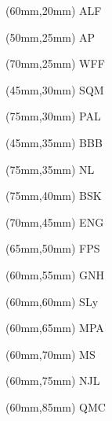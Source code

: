 \documentclass[11pt]{beamer}
\begin{document}
\begin{frame}{}

\begin{textblock*}{0.5pt}(60mm,20mm)
    ALF
    \end{textblock*}
    \begin{textblock*}{0.5pt}(50mm,25mm)
    AP
    \end{textblock*}
    \begin{textblock*}{0.5pt}(70mm,25mm)
    WFF
    \end{textblock*}
    \begin{textblock*}{0.5pt}(45mm,30mm)
    SQM
    \end{textblock*}
    \begin{textblock*}{0.5pt}(75mm,30mm)
    PAL
    \end{textblock*}
    \begin{textblock*}{0.5pt}(45mm,35mm)
    BBB
    \end{textblock*}
    \begin{textblock*}{0.5pt}(75mm,35mm)
    NL
    \end{textblock*}
    \begin{textblock*}{0.5pt}(75mm,40mm)
    BSK
    \end{textblock*}
    \begin{textblock*}{0.5pt}(70mm,45mm)
    ENG
    \end{textblock*}
    \begin{textblock*}{0.5pt}(65mm,50mm)
    FPS
    \end{textblock*}
    \begin{textblock*}{0.5pt}(60mm,55mm)
    GNH
    \end{textblock*}
    \begin{textblock*}{0.5pt}(60mm,60mm)
    SLy
    \end{textblock*}
    \begin{textblock*}{0.5pt}(60mm,65mm)
    MPA
    \end{textblock*}
    \begin{textblock*}{0.5pt}(60mm,70mm)
    MS
    \end{textblock*}
    \begin{textblock*}{0.5pt}(60mm,75mm)
    NJL
    \end{textblock*}
    \begin{textblock*}{0.5pt}(60mm,85mm)
    QMC
    \end{textblock*}
    \vspace{1cm}
    
\end{frame}
\end{document}
